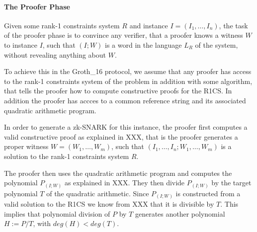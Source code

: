 \paragraph{The Proofer Phase} Given some rank-1 constraints system $R$ and instance $I=(I_1,\ldots, I_n)$, the task of the proofer phase is to convince any verifier, that a proofer knows a witness $W$ to instance $I$, such that $(I;W)$ is a word in the language $L_R$ of the system, without revealing anything about $W$. 

To achieve this in the Groth\_16 protocol, we assume that any proofer has access to the rank-1 constraints system of the problem in addition with some algorithm, that tells the proofer how to compute constructive proofs for the R1CS. In addition the proofer has accces to a common reference string and its associated quadratic arithmetic program. 

In order to generate a zk-SNARK for this instance, the proofer first computes a valid constructive proof as explained in XXX, that is the proofer generates a proper witness $W= (W_1,\ldots,W_m)$, such that $(I_1,\ldots, I_n; W_1,\ldots,W_m)$ is a solution to the rank-1 constraints system $R$. 

The proofer then uses the quadratic arithmetic program and computes the polynomial $P_{(I;W)}$ as explained in XXX. They then divide $P_{(I;W)}$ by the target polynomial $T$ of the quadratic arithmetic. Since $P_{(I;W)}$ is constructed from a valid solution to the R1CS we know from XXX that it is divisible by $T$. This implies that polynomial division of $P$ by $T$ generates another polynomial $H:= P / T$, with $deg(H)<deg(T)$. 


